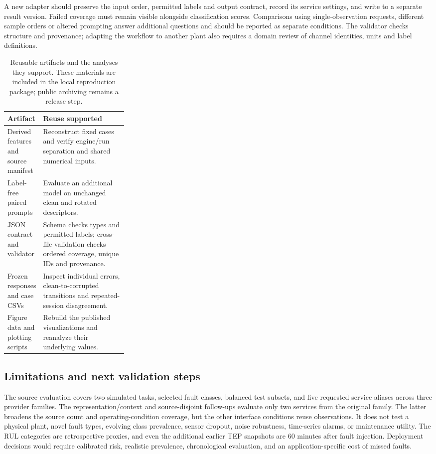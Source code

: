 \documentclass[11pt,a4paper]{article}
\begin{document}
A new adapter should preserve the input order, permitted labels and output contract, record its service settings, and write to a separate result version. Failed coverage must remain visible alongside classification scores. Comparisons using single-observation requests, different sample orders or altered prompting answer additional questions and should be reported as separate conditions. The validator checks structure and provenance; adapting the workflow to another plant also requires a domain review of channel identities, units and label definitions.

\begin{table}[htbp]
\centering\small
\caption{Reusable artifacts and the analyses they support. These materials are included in the local reproduction package; public archiving remains a release step.}
\label{tab:reuse}
\begin{tabularx}{\linewidth}{@{}>{\raggedright\arraybackslash}p{0.28\linewidth}>{\raggedright\arraybackslash}X@{}}
\toprule
Artifact & Reuse supported \\
\midrule
Derived features and source manifest & Reconstruct fixed cases and verify engine/run separation and shared numerical inputs. \\
Label-free paired prompts & Evaluate an additional model on unchanged clean and rotated descriptors. \\
JSON contract and validator & Schema checks types and permitted labels; cross-file validation checks ordered coverage, unique IDs and provenance. \\
Frozen responses and case CSVs & Inspect individual errors, clean-to-corrupted transitions and repeated-session disagreement. \\
Figure data and plotting scripts & Rebuild the published visualizations and reanalyze their underlying values. \\
\bottomrule
\end{tabularx}
\end{table}

\subsection{Limitations and next validation steps}
The source evaluation covers two simulated tasks, selected fault classes, balanced test subsets, and five requested service aliases across three provider families. The representation/context and source-disjoint follow-ups evaluate only two services from the original family. The latter broadens the source count and operating-condition coverage, but the other interface conditions reuse observations. It does not test a physical plant, novel fault types, evolving class prevalence, sensor dropout, noise robustness, time-series alarms, or maintenance utility. The RUL categories are retrospective proxies, and even the additional earlier TEP snapshots are 60 minutes after fault injection. Deployment decisions would require calibrated risk, realistic prevalence, chronological evaluation, and an application-specific cost of missed faults.
\end{document}
